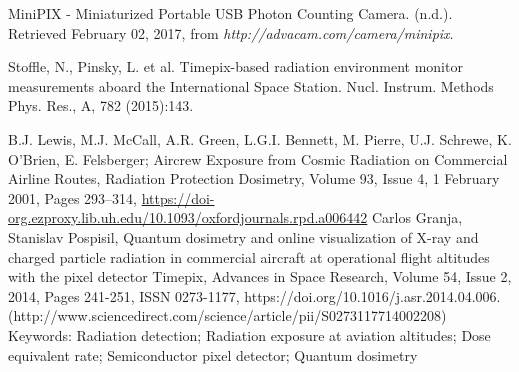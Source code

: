 



\begin{thebibliography}{00}


MiniPIX - Miniaturized Portable USB Photon Counting Camera. (n.d.). Retrieved February 02, 2017, from \textit{http://advacam.com/camera/minipix}.

 Stoffle, N., Pinsky, L. et al. Timepix-based radiation environment monitor measurements aboard the International Space Station. Nucl. Instrum. Methods Phys.
Res., A, 782 (2015):143.

 B.J. Lewis, M.J. McCall, A.R. Green, L.G.I. Bennett, M. Pierre, U.J. Schrewe, K. O'Brien, E. Felsberger; Aircrew Exposure from Cosmic Radiation on Commercial Airline Routes, Radiation Protection Dosimetry, Volume 93, Issue 4, 1 February 2001, Pages 293–314, \url{https://doi-org.ezproxy.lib.uh.edu/10.1093/oxfordjournals.rpd.a006442}
 Carlos Granja, Stanislav Pospisil,
Quantum dosimetry and online visualization of X-ray and charged particle radiation in commercial aircraft at operational flight altitudes with the pixel detector Timepix,
Advances in Space Research,
Volume 54, Issue 2,
2014,
Pages 241-251,
ISSN 0273-1177,
https://doi.org/10.1016/j.asr.2014.04.006.
(http://www.sciencedirect.com/science/article/pii/S0273117714002208)
Keywords: Radiation detection; Radiation exposure at aviation altitudes; Dose equivalent rate; Semiconductor pixel detector; Quantum dosimetry


\end{thebibliography}
